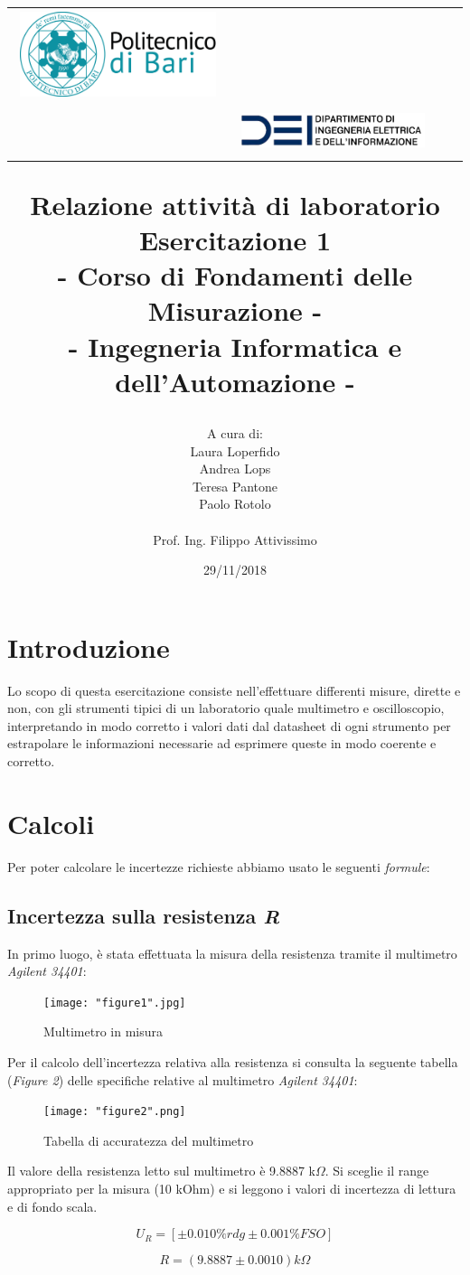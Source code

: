 \documentclass[a4paper]{article}
\title{\begin{center}
		\setlength{\tabcolsep}{0pt}
		\begin{tabular}{>{\raggedleft}m{3cm}>{\centering}m{\textwidth - 5cm\relax}>{\raggedright}m{3cm}}
			\includegraphics[width=\linewidth]{poliba.png}%
			&%
			\textbf{ } \\[5pt]%
			\textbf{\ }%
			&%
			\includegraphics[width=\linewidth]{dei.png} %
		\end{tabular}
	\end{center}
	\textbf{Relazione attività di laboratorio\\}
	\textbf{\large Esercitazione 1\\- Corso di Fondamenti delle Misurazione -\\ }
	{\normalsize 
		- Ingegneria Informatica e dell'Automazione -
}}
\author{A cura di:\\
	Laura Loperfido\\
	Andrea Lops \\
	Teresa Pantone\\
	Paolo Rotolo\\
	\\
	Prof. Ing. Filippo Attivissimo
}
\date{29/11/2018}
\begin{document}
\maketitle

\section{Introduzione}

Lo scopo di questa esercitazione consiste nell'effettuare differenti misure, dirette e non, con gli strumenti tipici di un laboratorio quale multimetro e oscilloscopio,  interpretando in modo corretto i valori dati dal datasheet di ogni strumento per estrapolare le informazioni necessarie ad esprimere queste in modo coerente e corretto.

\section{Calcoli}

Per poter calcolare le incertezze richieste abbiamo usato le seguenti \emph{formule}:\\
\subsection {Incertezza sulla resistenza \emph{R}}

In primo luogo, è stata effettuata la misura della resistenza tramite il multimetro \emph{Agilent 34401}:

\begin{figure}[htp]
	\centering
	\texttt{[image: "figure1".jpg]}
	\caption{Multimetro in misura}
	\label{}
\end{figure}
\noindent 
Per il calcolo dell'incertezza relativa alla resistenza si consulta la seguente tabella (\emph{Figure 2}) delle specifiche relative al multimetro \emph{Agilent 34401}:
\begin{center}
	\begin{figure}[htp]
		\centering
		\texttt{[image: "figure2".png]}
		\caption{Tabella di accuratezza del multimetro}
		\label{a}
	\end{figure}
\end{center}

Il valore della resistenza letto sul multimetro è  9.8887 k$\Omega$. Si sceglie il range appropriato per la misura (10 kOhm) e si leggono i valori di incertezza di lettura e di fondo scala.

\begin{Large} 
	\begin{equation} 
		U_{R} = [\pm 0.010\%rdg \pm 0.001\% FSO]
	 \end{equation}
	 
	 \begin{equation} 
	 	R =( 9.8887 \pm 0.0010) k\Omega 
	 \end{equation}
\end{Large}
\end{document}
